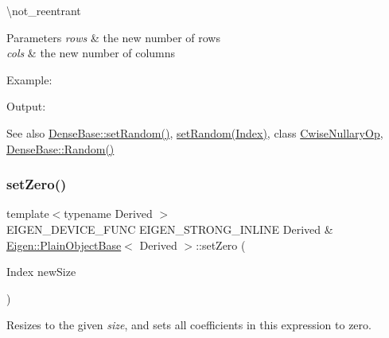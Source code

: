 \textbackslash{}not\+\_\+reentrant


\begin{DoxyParams}{Parameters}
{\em rows} & the new number of rows \\
\hline
{\em cols} & the new number of columns\\
\hline
\end{DoxyParams}
Example\+: 
\begin{DoxyCodeInclude}{0}
\end{DoxyCodeInclude}
 Output\+: 
\begin{DoxyVerbInclude}
\end{DoxyVerbInclude}


\begin{DoxySeeAlso}{See also}
\mbox{\hyperlink{class_eigen_1_1_dense_base_ac476e5852129ba32beaa1a8a3d7ee0db}{Dense\+Base\+::set\+Random()}}, \mbox{\hyperlink{class_eigen_1_1_plain_object_base_af0e576a0e1aefc9ee346de44cc352ba3}{set\+Random(\+Index)}}, class \mbox{\hyperlink{class_eigen_1_1_cwise_nullary_op}{Cwise\+Nullary\+Op}}, \mbox{\hyperlink{class_eigen_1_1_dense_base_ae814abb451b48ed872819192dc188c19}{Dense\+Base\+::\+Random()}} 
\end{DoxySeeAlso}
\mbox{\label{class_eigen_1_1_plain_object_base_ac21ad5f989f320e46958b75ac8d9a1da}} 
\subsubsection{\texorpdfstring{setZero()}{setZero()}\hspace{0.1cm}{\footnotesize\ttfamily [1/2]}}
{\footnotesize\ttfamily template$<$typename Derived $>$ \\
E\+I\+G\+E\+N\+\_\+\+D\+E\+V\+I\+C\+E\+\_\+\+F\+U\+NC E\+I\+G\+E\+N\+\_\+\+S\+T\+R\+O\+N\+G\+\_\+\+I\+N\+L\+I\+NE Derived \& \mbox{\hyperlink{class_eigen_1_1_plain_object_base}{Eigen\+::\+Plain\+Object\+Base}}$<$ Derived $>$\+::set\+Zero (\begin{DoxyParamCaption}\item[{Index}]{new\+Size }\end{DoxyParamCaption})}

Resizes to the given {\itshape size}, and sets all coefficients in this expression to zero.


